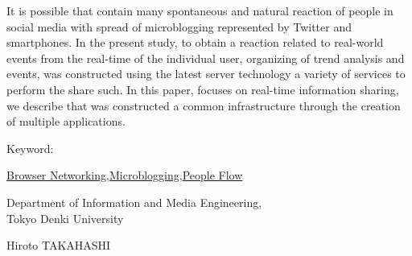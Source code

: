 It is possible that contain many spontaneous and natural reaction of people in social media with spread of microblogging represented by Twitter and smartphones. In the present study, to obtain a reaction related to real-world events from the real-time of the individual user, organizing of trend analysis and events, was constructed using the latest server technology a variety of services to perform the share such. In this paper, focuses on real-time information sharing, we describe that was constructed a common infrastructure through the creation of multiple applications.


\begin{flushleft}Keyword:\\
\end{flushleft}
{\underline{Browser Networking},\underline{Microblogging},\underline{People Flow}}

\begin{flushright}
\vspace{10mm}

\vspace{5mm}
\large Department of Information and Media Engineering,\\
Tokyo Denki University\\
\begin{flushright}\LARGE Hiroto TAKAHASHI\\
\end{flushright}

\end{flushright}
